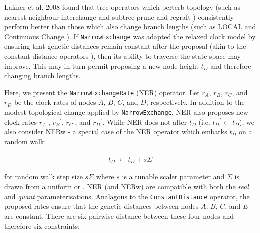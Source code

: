 \documentclass[10pt,letterpaper]{article}
\begin{document}
Lakner et al. 2008 \cite{lakner2008efficiency} found that tree operators which perterb topology (such as nearest-neighbour-interchange and subtree-prune-and-regraft \cite{semple2003phylogenetics}) consistently perform better than those which also change branch lengths (such as LOCAL \cite{simon1998local} and Continuous Change \cite{jow2002bayesian}). 
If \texttt{NarrowExchange} was adapted the relaxed clock model by ensuring that genetic distances remain constant after the proposal (akin to the constant distance operators \cite{zhang2020improving}), then its ability to traverse the state space may improve. 
This may in turn permit proposing a new node height $t_D$ and therefore changing branch lengths.



Here, we present the \texttt{NarrowExchangeRate} (NER) operator. 
Let $r_A$, $r_B$, $r_C$, and $r_D$ be the clock rates of nodes $A$, $B$, $C$, and $D$, respectively. 
In addition to the modest topological change applied by \texttt{NarrowExchange}, NER also proposes new clock rates ${r_A}^\prime$, ${r_B}^\prime$, ${r_C}^\prime$, and ${r_D}^\prime$. While NER does not alter $t_D$ (i.e. ${t_D}^\prime \leftarrow t_D$), we also consider NERw - a special case of the NER operator which embarks $t_D$ on a random walk:

\begin{align}
	{t_D}^\prime \leftarrow t_D + s\Sigma
\end{align}

for random walk step size $s\Sigma$ where $s$ is a tunable scaler parameter and $\Sigma$ is drawn from a uniform or \textbf{}. NER (and NERw) are compatible with both the \textit{real} and \textit{quant} parameterisations. 
Analagous to the \texttt{ConstantDistance} operator, the proposed rates ensure that the genetic distances between nodes $A$, $B$, $C$, and $E$ are constant. 
There are six pairwise distance between these four nodes and therefore six constraints:
\end{document}

